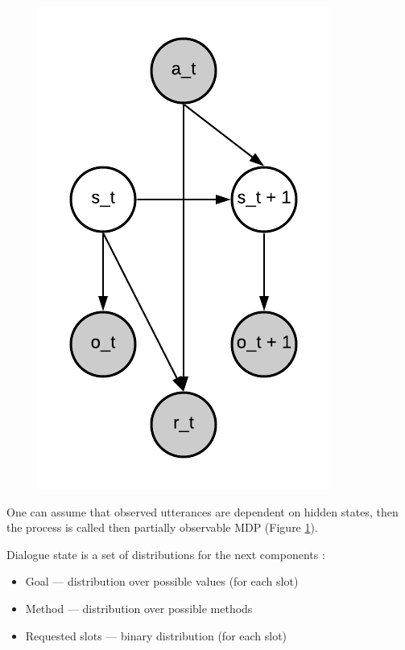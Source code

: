 \documentclass[12pt,titlepage,a4paper]{article}
\begin{document}
\begin{figure}[!htb]
      \includegraphics[width=\linewidth]{partial-markov.png}
      \caption{}
      \label{PartialMarkov}
    \endminipage
\end{figure}

One can assume that observed utteran\-ces are dependent on hidden states, then the process is called then partially observable MDP (Figure \ref{PartialMarkov}).

Dialogue state is a set of distributions for the next components \cite{DST}: 
\begin{itemize}
    \item Goal --- distribution over possible values (for each slot)
    \item Method --- distribution over possible methods
    \item Requested slots --- binary distribution (for each slot)
\end{itemize}
\end{document}
